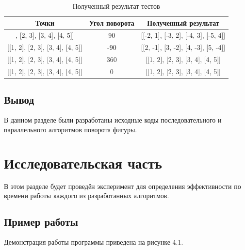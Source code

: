 \documentclass[12pt]{report}
\begin{document}
	\begin{table}[h]
		\label{tabular:func2}
		\caption{Полученный результат тестов}
		\begin{center}
			\begin{tabular}{ | c | c | c |}
				\hline
				\textbf{Точки} & \textbf{Угол поворота} & \textbf{Полученный результат}\\ \hline
				[[1, 2], [2, 3], [3, 4], [4, 5]] & 90 &
				[[-2, 1], [-3, 2], [-4, 3], [-5, 4]] \\
				\hline
				
				[[1, 2], [2, 3], [3, 4], [4, 5]] & -90 &
				[[2, -1], [3, -2], [4, -3], [5, -4]] \\
				\hline
				
				[[1, 2], [2, 3], [3, 4], [4, 5]] & 360 &
				[[1, 2], [2, 3], [3, 4], [4, 5]] \\
				\hline
				
				[[1, 2], [2, 3], [3, 4], [4, 5]] & 0 &
				[[1, 2], [2, 3], [3, 4], [4, 5]] \\
				\hline
			\end{tabular}
		\end{center}
	\end{table}

	\newpage
	
	\section{Вывод}
	В данном разделе были разработаны исходные коды последовательного и параллельного алгоритмов поворота фигуры.
	
	\chapter{Исследовательская часть}
	В этом разделе будет проведён эксперимент для определения эффективности по времени работы каждого из разработанных алгоритмов.
	
	\section{Пример работы}
	
	Демонстрация работы программы приведена на рисунке 4.1.
	
\end{document}
